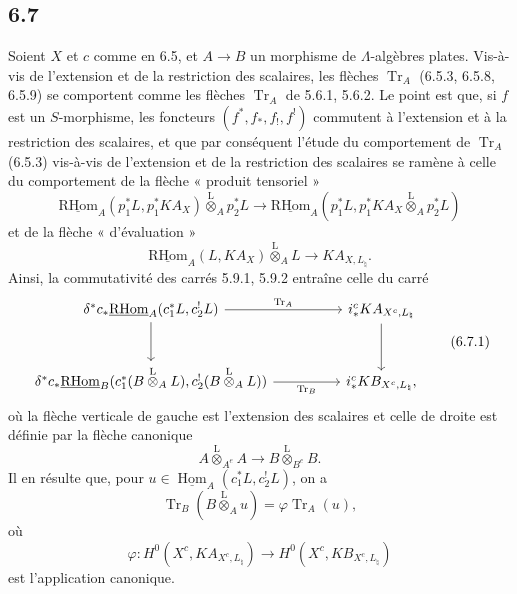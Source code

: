 \documentclass[11pt]{article}
\DeclareMathOperator{\Hom}{Hom}
\newcommand{\R}{\mathrm{R}}\newcommand{\RHomCore}{\mathrm{RHom}}
\providecommand{\RHom}{\RHomCore}
\providecommand{\uRHom}{\underline{\RHom}}
\providecommand{\uHom}{\underline{\Hom}}
\providecommand{\Tr}{\operatorname{Tr}}
\providecommand{\Tr}{\operatorname{Tr}}
\providecommand{\lten}{\overset{\mathrm L}{\otimes}}
\providecommand{\Tr}{\operatorname{Tr}}
\providecommand{\RHom}{\RHomCore}
\providecommand{\Hom}{\operatorname{Hom}}
\providecommand{\lten}{\overset{\mathrm L}{\otimes}}
\providecommand{\RHom}{\R\mathcal{H}om}
\providecommand{\lten}{\overset{\mathrm L}{\otimes}}
\providecommand{\R}{\mathrm R}
\providecommand{\Tr}{\operatorname{Tr}}
\providecommand{\lten}{\overset{\mathrm L}{\otimes}}
\providecommand{\lten}{\overset{\mathrm L}{\otimes}}
\providecommand{\lten}{\overset{\mathrm L}{\otimes}}
\providecommand{\RHom}{\RHomCore}
\providecommand{\Hom}{\operatorname{Hom}}
\providecommand{\Tr}{\operatorname{Tr}}
\providecommand{\lten}{\overset{\mathrm L}{\otimes}}
\begin{document}
\subsection*{6.7}
Soient $X$ et $c$ comme en 6.5, et $A\to B$ un morphisme de $\Lambda$-algèbres plates. Vis-à-vis de l'extension et de la restriction des scalaires, les flèches $\Tr_A$ (6.5.3, 6.5.8, 6.5.9) se comportent comme les flèches $\Tr_A$ de 5.6.1, 5.6.2. Le point est que, si $f$ est un $S$-morphisme, les foncteurs $(f^*,f_*,f_!,f^!)$ commutent à l'extension et à la restriction des scalaires, et que par conséquent l'étude du comportement de $\Tr_A$ (6.5.3) vis-à-vis de l'extension et de la restriction des scalaires se ramène à celle du comportement de la flèche « produit tensoriel »
\[
\uRHom_A(p_1^*L,p_1^*KA_X)\lten_Ap_2^*L
\longrightarrow
\uRHom_A(p_1^*L,p_1^*KA_X\lten_Ap_2^*L)
\]
et de la flèche « d'évaluation »
\[
\uRHom_A(L,KA_X)\lten_A L\longrightarrow KA_{X,L_{\natural}}.
\]
Ainsi, la commutativité des carrés 5.9.1, 5.9.2 entraîne celle du carré
\begin{equation}
\begin{tikzcd}[column sep=huge,row sep=large]
\delta^*c_*\uRHom_A(c_1^*L,c_2^!L) \arrow[r,"\Tr_A"] \arrow[d]
& i_*^cKA_{X^c,L_{\natural}} \arrow[d]\\
\delta^*c_*\uRHom_B(c_1^*(B\lten_A L),c_2^!(B\lten_A L)) \arrow[r,"\Tr_B"']
& i_*^cKB_{X^c,L_{\natural}},
\end{tikzcd}
\tag{6.7.1}
\end{equation}
où la flèche verticale de gauche est l'extension des scalaires et celle de droite est définie par la flèche canonique
\[
A\lten_{A^e}A\longrightarrow B\lten_{B^e}B.
\]
Il en résulte que, pour $u\in\uHom_A(c_1^*L,c_2^!L)$, on a
\begin{equation}
\Tr_B(B\lten_Au)=\varphi\Tr_A(u),
\tag{6.7.2}
\end{equation}
où
\[
\varphi:H^0(X^c,KA_{X^c,L_{\natural}})\longrightarrow H^0(X^c,KB_{X^c,L_{\natural}})
\]
est l'application canonique.
\end{document}
